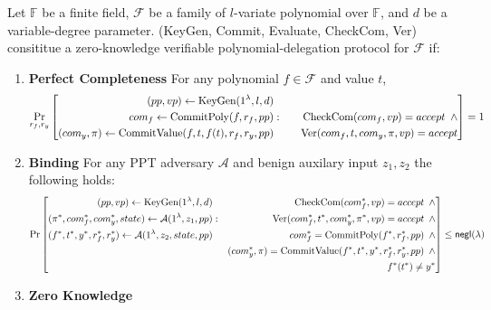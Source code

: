 \begin{definition}
	\label{def::zkvpd}
	Let $\mathbb{F}$ be a finite field, $\mathcal{F}$ be a family of $l$-variate polynomial over $\mathbb{F}$, and $d$ be a variable-degree parameter. \textnormal{(KeyGen, Commit, Evaluate, CheckCom, Ver)} consititue a \textnormal{zero-knowledge verifiable polynomial-delegation} protocol for $\mathcal{F}$ if:
	\begin{enumerate}
		\item \textbf{Perfect Completeness}
			For any polynomial $f \in \mathcal{F}$ and value $t$,
			\[\Pr_{r_f, r_y}\left[
				\begin{aligned}
					(pp, vp) \leftarrow \textnormal{KeyGen}(1^\lambda, l, d) && \\
					com_f \leftarrow \textnormal{CommitPoly}(f, r_f, pp) &:&  \textnormal{CheckCom}(com_f, vp)=accept \hspace*{5pt}\land \\
					(com_y, \pi) \leftarrow \textnormal{CommitValue}(f, t, f(t), r_f, r_y, pp) && \hspace*{10pt}\textnormal{Ver}(com_f, t, com_y, \pi, vp)=accept\\
				\end{aligned}
			\right]=1\]
		\item \textbf{Binding}
		For any PPT adversary $\mathcal{A}$ and benign auxilary input $z_1, z_2$ the following holds:
		\[\Pr \left[
			\begin{aligned}
				(pp,vp) \leftarrow \textnormal{KeyGen}(1^\lambda, l, d) && \textnormal{CheckCom}(com_f^*, vp) = accept \hspace*{5pt}\land\\
				(\pi^*, com_f^*, com_y^*, state) \leftarrow \mathcal{A}(1^\lambda, z_1, pp) &:& \textnormal{Ver}(com_f^*, t^*, com_y^*, \pi^*, vp)=accept \hspace*{5pt} \land\\
				(f^*, t^*, y^*, r_f^*, r_y^*) \leftarrow \mathcal{A}(1^\lambda, z_2, state, pp) && com_f^*=\textnormal{CommitPoly}(f^*, r_f^*, pp) \hspace*{5pt} \land\\
				&& (com_y^*, \pi) = \textnormal{CommitValue}(f^*, t^*, y^*, r_f^*, r_y^*, pp) \hspace*{5pt} \land \\
				&& f^*(t^*) \neq y^*\\
			\end{aligned}
		\right]\le {\sf negl}{(\lambda)}\]
		\item \textbf{Zero Knowledge}
	\end{enumerate}
\end{definition}